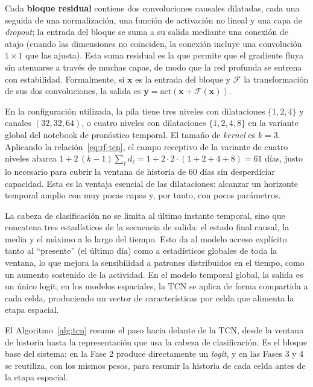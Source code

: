 Cada \textbf{bloque residual} contiene dos convoluciones causales dilatadas, cada una seguida
de una normalización, una función de activación no lineal y una capa de \textit{dropout}; la
entrada del bloque se suma a su salida mediante una conexión de atajo (cuando las dimensiones
no coinciden, la conexión incluye una convolución \(1\times 1\) que las ajusta). Esta suma
residual es la que permite que el gradiente fluya sin atenuarse a través de muchas capas, de
modo que la red profunda se entrena con estabilidad. Formalmente, si \(\mathbf{x}\) es la
entrada del bloque y \(\mathcal{F}\) la transformación de sus dos convoluciones, la salida es
\(\mathbf{y} = \text{act}(\mathbf{x} + \mathcal{F}(\mathbf{x}))\).

En la configuración utilizada, la pila tiene tres niveles con dilataciones \(\{1,2,4\}\) y
canales \((32, 32, 64)\), o cuatro niveles con dilataciones \(\{1,2,4,8\}\) en la variante
global del notebook de pronóstico temporal. El tamaño de \textit{kernel} es \(k=3\). Aplicando
la relación~\eqref{eq:rf-tcn}, el campo receptivo de la variante de cuatro niveles abarca
\(1 + 2\,(k-1)\sum_{\ell} d_\ell = 1 + 2\cdot 2\cdot(1{+}2{+}4{+}8) = 61\) días, justo lo
necesario para cubrir la ventana de historia de 60 días sin desperdiciar capacidad. Esta es la
ventaja esencial de las dilataciones: alcanzar un horizonte temporal amplio con muy pocas capas
y, por tanto, con pocos parámetros.

La cabeza de clasificación no se limita al último instante temporal, sino que concatena tres
estadísticos de la secuencia de salida: el estado final causal, la media y el máximo a lo largo
del tiempo. Esto da al modelo acceso explícito tanto al ``presente'' (el último día) como a
estadísticos globales de toda la ventana, lo que mejora la sensibilidad a patrones distribuidos
en el tiempo, como un aumento sostenido de la actividad. En el modelo temporal global, la salida
es un único logit; en los modelos espaciales, la TCN se aplica de forma compartida a cada celda,
produciendo un vector de características por celda que alimenta la etapa espacial.

El Algoritmo~\ref{alg:tcn} resume el paso hacia delante de la TCN, desde la ventana de historia
hasta la representación que usa la cabeza de clasificación. Es el bloque base del sistema: en la
Fase 2 produce directamente un \textit{logit}, y en las Fases 3 y 4 se reutiliza, con los mismos
pesos, para resumir la historia de cada celda antes de la etapa espacial.

